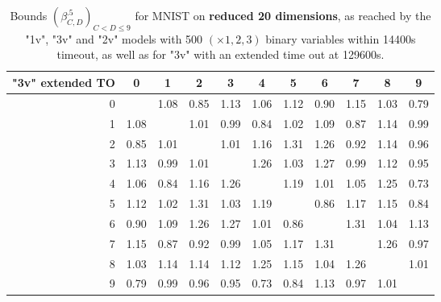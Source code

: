 \begin{table*}
	
	
	
	

	
\vspace{0.6cm}

\begin{tabular}{|r||c|c|c|c|c|c|c|c|c|c|}\hline
		{\bf "3v" extended TO} & 0 & 1 & 2 & 3 & 4 & 5 & 6 & 7 & 8 & 9 \\\hline\hline
		0 & &1.08 &0.85 &1.13 &1.06 &1.12 &0.90 &1.15 &1.03 &0.79  \\\hline
		1 &1.08 & &1.01 &0.99 &0.84 &1.02 &1.09 &0.87 &1.14 &0.99  \\\hline
		2 &0.85 &1.01 & &1.01 &1.16 &1.31 &1.26 &0.92 &1.14 &0.96  \\\hline
		3 &1.13 &0.99 &1.01 & &1.26 &1.03 &1.27 &0.99 &1.12 &0.95  \\\hline
		4 &1.06 &0.84 &1.16 &1.26 & &1.19 &1.01 &1.05 &1.25 &0.73  \\\hline
		5 &1.12 &1.02 &1.31 &1.03 &1.19 & &0.86 &1.17 &1.15 &0.84  \\\hline
		6 &0.90 &1.09 &1.26 &1.27 &1.01 &0.86 & &1.31 &1.04 &1.13  \\\hline
		7 &1.15 &0.87 &0.92 &0.99 &1.05 &1.17 &1.31 & &1.26 &0.97  \\\hline
		8 &1.03 &1.14 &1.14 &1.12 &1.25 &1.15 &1.04 &1.26 & &1.01  \\\hline
		9 &0.79 &0.99 &0.96 &0.95 &0.73 &0.84 &1.13 &0.97 &1.01 &  \\\hline
		
	\end{tabular}
	


	\caption{Bounds $(\beta^{.5}_{C,D})_{C < D \leq 9}$ 
	for MNIST on {\bf reduced 20 dimensions}, as reached by the "1v", "3v" and "2v" models
	with 500 $(\times 1,2,3)$ binary variables within 14400s timeout, as well as for "3v" with an extended time out at 
	129600s.}
    \label{table.pair}
\end{table*}


